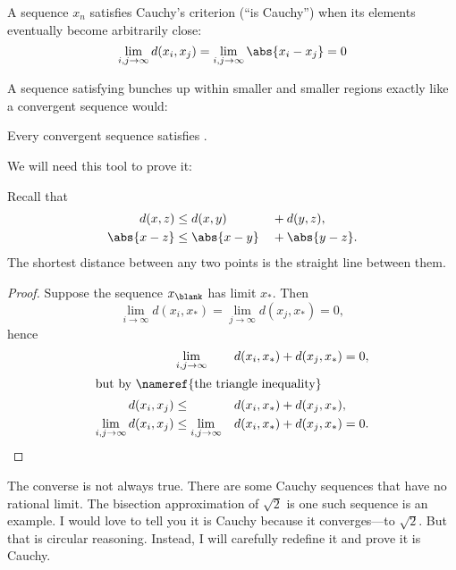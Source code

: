 \documentclass{scrartcl}
\newcommand{\dist}{d}
\begin{document}
\begin{defn}\label{Cauchy's criterion}
  A sequence \(x_{n}\) satisfies Cauchy's criterion (``is Cauchy'') when its elements eventually become arbitrarily close:
  \[
    \lim_{i,j\to\infty} d(x_{i},x_{j})=\lim_{i,j\to \infty} \abs{x_{i}-x_{j}} =0
  \]
\end{defn}
A sequence satisfying  bunches up within smaller and smaller regions exactly like a convergent sequence would:
\begin{theorem}
  Every convergent sequence satisfies .
\end{theorem}
We will need this tool to prove it:
\begin{lemma}\label{the triangle inequality}
  Recall that
  \begin{alignat*}{3}
    \dist(x,z)&\leq d(x,y)&&+d(y,z),\\
    \abs{x-z}&\leq \abs{x-y}&&+\abs{y-z}.
  \end{alignat*}
  The shortest distance between any two points is the straight line between them.
\end{lemma}
\begin{proof}

  Suppose the sequence \(x_{\blank}\) has limit \(x_{*}\). Then
  \[
    \lim_{i\to\infty} \dist(x_{i},x_*) = \lim_{j\to\infty} \dist(x_{j},x_{*})=0,
  \]
  hence
  \begin{alignat*}{3}
    &\lim_{i,j\to\infty}&&\dist(x_{i},x_{*})+\dist(x_{j},x_{*}) = 0, \\
    \shortintertext{but by \nameref{the triangle inequality}}
    \dist(x_{i},x_{j}) &\leq &&\dist(x_{i},x_{*}) + \dist(x_{j},x_{*}), \\
    \lim_{i,j\to \infty} \dist(x_{i},x_{j}) &\leq \lim_{i,j\to \infty} &&\dist(x_{i},x_{*})+\dist(x_{j},x_{*}) = 0.
  \end{alignat*}
\end{proof}
The converse is not always true. There are some Cauchy sequences that have no rational limit. The bisection approximation of \(\sqrt 2\) is one such sequence is an example. I would love to tell you it is Cauchy because it converges---to \(\sqrt 2\). But that is circular reasoning. Instead, I will carefully redefine it and prove it is Cauchy.
\end{document}
